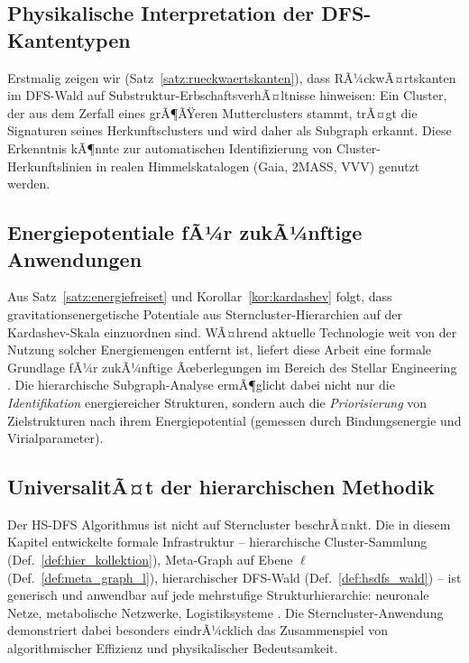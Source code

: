 ﻿\documentclass[a4paper,12pt]{report}
\theoremstyle{definition}
\begin{document}
\subsection{Physikalische Interpretation der DFS-Kantentypen}

Erstmalig zeigen wir (Satz~\ref{satz:rueckwaertskanten}), dass RÃ¼ckwÃ¤rtskanten im DFS-Wald auf Substruktur-ErbschaftsverhÃ¤ltnisse hinweisen: Ein Cluster, der aus dem Zerfall eines grÃ¶ÃŸeren Mutterclusters stammt, trÃ¤gt die Signaturen seines Herkunftsclusters und wird daher als Subgraph erkannt. Diese Erkenntnis kÃ¶nnte zur automatischen Identifizierung von Cluster-Herkunftslinien in realen Himmelskatalogen (Gaia, 2MASS, VVV) genutzt werden.

\subsection{Energiepotentiale fÃ¼r zukÃ¼nftige Anwendungen}

Aus Satz~\ref{satz:energiefreiset} und Korollar~\ref{kor:kardashev} folgt, dass gravitationsenergetische Potentiale aus Sterncluster-Hierarchien auf der Kardashev-Skala einzuordnen sind. WÃ¤hrend aktuelle Technologie weit von der Nutzung solcher Energiemengen entfernt ist, liefert diese Arbeit eine formale Grundlage fÃ¼r zukÃ¼nftige Ãœberlegungen im Bereich des Stellar Engineering \cite{dyson1960, kardashev1964}. Die hierarchische Subgraph-Analyse ermÃ¶glicht dabei nicht nur die \emph{Identifikation} energiereicher Strukturen, sondern auch die \emph{Priorisierung} von Zielstrukturen nach ihrem Energiepotential (gemessen durch Bindungsenergie und Virialparameter).

\subsection{UniversalitÃ¤t der hierarchischen Methodik}

Der HS-DFS Algorithmus ist nicht auf Sterncluster beschrÃ¤nkt. Die in diesem Kapitel entwickelte formale Infrastruktur -- hierarchische Cluster-Sammlung (Def.~\ref{def:hier_kollektion}), Meta-Graph auf Ebene $\ell$ (Def.~\ref{def:meta_graph_l}), hierarchischer DFS-Wald (Def.~\ref{def:hsdfs_wald}) -- ist generisch und anwendbar auf jede mehrstufige Strukturhierarchie: neuronale Netze, metabolische Netzwerke, Logistiksysteme \cite{epp2026msubgraph}. Die Sterncluster-Anwendung demonstriert dabei besonders eindrÃ¼cklich das Zusammenspiel von algorithmischer Effizienz und physikalischer Bedeutsamkeit.
\end{document}

